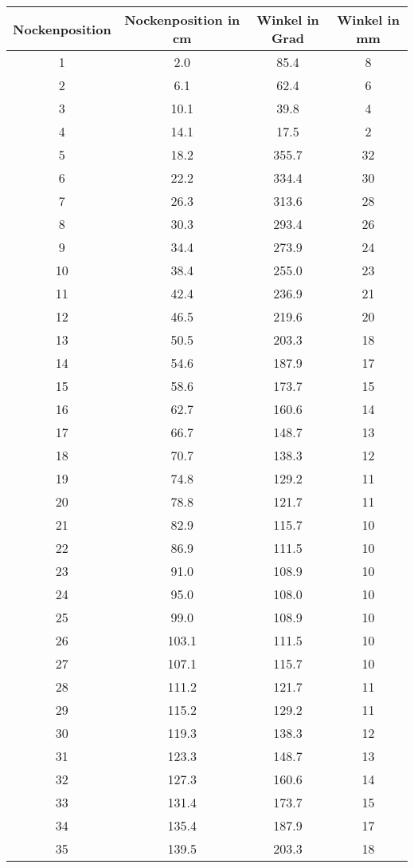 \documentclass[10pt, a4paper]{article}
\begin{document}
\begin{center}
	\begin{tabular}{c|c|c|c}
		Nockenposition & Nockenposition in cm & Winkel in Grad & Winkel in mm \\
		\hline
		1 & 2.0 & 85.4 & 8 \\
		2 & 6.1 & 62.4 & 6 \\
		3 & 10.1 & 39.8 & 4 \\
		4 & 14.1 & 17.5 & 2 \\
		5 & 18.2 & 355.7 & 32 \\
		6 & 22.2 & 334.4 & 30 \\
		7 & 26.3 & 313.6 & 28 \\
		8 & 30.3 & 293.4 & 26 \\
		9 & 34.4 & 273.9 & 24 \\
		10 & 38.4 & 255.0 & 23 \\
		11 & 42.4 & 236.9 & 21 \\
		12 & 46.5 & 219.6 & 20 \\
		13 & 50.5 & 203.3 & 18 \\
		14 & 54.6 & 187.9 & 17 \\
		15 & 58.6 & 173.7 & 15 \\
		16 & 62.7 & 160.6 & 14 \\
		17 & 66.7 & 148.7 & 13 \\
		18 & 70.7 & 138.3 & 12 \\
		19 & 74.8 & 129.2 & 11 \\
		20 & 78.8 & 121.7 & 11 \\
		21 & 82.9 & 115.7 & 10 \\
		22 & 86.9 & 111.5 & 10 \\
		23 & 91.0 & 108.9 & 10 \\
		24 & 95.0 & 108.0 & 10 \\
		25 & 99.0 & 108.9 & 10 \\
		26 & 103.1 & 111.5 & 10 \\
		27 & 107.1 & 115.7 & 10 \\
		28 & 111.2 & 121.7 & 11 \\
		29 & 115.2 & 129.2 & 11 \\
		30 & 119.3 & 138.3 & 12 \\
		31 & 123.3 & 148.7 & 13 \\
		32 & 127.3 & 160.6 & 14 \\
		33 & 131.4 & 173.7 & 15 \\
		34 & 135.4 & 187.9 & 17 \\
		35 & 139.5 & 203.3 & 18 \\

\end{tabular}
\end{center}
\end{document}
